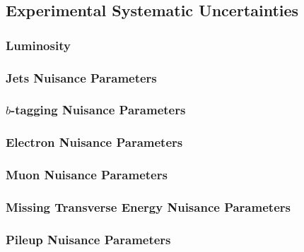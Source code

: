 \documentclass[10pt,twoside,cucitura,classica,openany]{toptesi}
\begin{document}


\subsection{Experimental Systematic Uncertainties}
\label{sec:exper-syst-uncert}



\subsubsection{Luminosity}
\label{sec:luminosity}



\subsubsection{Jets Nuisance Parameters}
\label{sec:jets-nuis-param}



\subsubsection{$b$-tagging Nuisance Parameters}
\label{sec:b-tagging-nuisance}



\subsubsection{Electron Nuisance Parameters}
\label{sec:electr-nuis-param}



\subsubsection{Muon Nuisance Parameters}
\label{sec:muon-nuis-param}



\subsubsection{Missing Transverse Energy Nuisance Parameters}
\label{sec:met-np}



\subsubsection{Pileup Nuisance Parameters}
\label{sec:pile-nuis-param}
\end{document}
